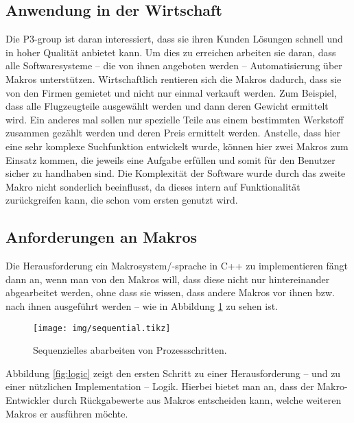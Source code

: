   \subsection{Anwendung in der Wirtschaft}
  \label{ssec:anwendung_in_der_wirtschaft}
    Die P3-group ist daran interessiert, dass sie ihren Kunden Lösungen schnell und in hoher Qualität anbietet kann. Um dies zu erreichen arbeiten sie daran, dass alle Softwaresysteme -- die von ihnen angeboten werden -- Automatisierung über Makros unterstützen. Wirtschaftlich rentieren sich die Makros dadurch, dass sie von den Firmen gemietet und nicht nur einmal verkauft werden. Zum Beispiel, dass alle Flugzeugteile ausgewählt werden und dann deren Gewicht ermittelt wird. Ein anderes mal sollen nur spezielle Teile aus einem bestimmten Werkstoff zusammen gezählt werden und deren Preis ermittelt werden. Anstelle, dass hier eine sehr komplexe Suchfunktion entwickelt wurde, können hier zwei Makros zum Einsatz kommen, die jeweils eine Aufgabe erfüllen und somit für den Benutzer sicher zu handhaben sind. Die Komplexität der Software wurde durch das zweite Makro nicht sonderlich beeinflusst, da dieses intern auf Funktionalität zurückgreifen kann, die schon vom ersten genutzt wird.

  \subsection{Anforderungen an Makros}
  \label{ssec:anforderungen_an_macros}
    Die Herausforderung ein Makrosystem/-sprache in C++ zu implementieren fängt dann an, wenn man von den Makros will, dass diese nicht nur hintereinander abgearbeitet werden, ohne dass sie wissen, dass andere Makros vor ihnen bzw. nach ihnen ausgeführt werden -- wie in Abbildung \ref{fig:sequential} zu sehen ist.

    \begin{figure}[H]
      \centering
      \texttt{[image: img/sequential.tikz]}
      \caption{Sequenzielles abarbeiten von Prozessschritten.}
      \label{fig:sequential}
    \end{figure}

    Abbildung \ref{fig:logic} zeigt den ersten Schritt zu einer Herausforderung -- und zu einer nützlichen Implementation -- Logik. Hierbei bietet man an, dass der Makro-Entwickler durch Rückgabewerte aus Makros entscheiden kann, welche weiteren Makros er ausführen möchte.

